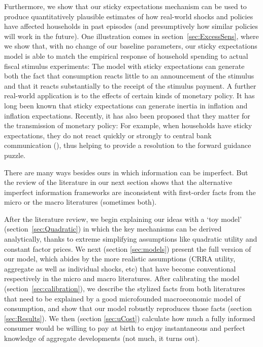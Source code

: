 \documentclass[titlepage]{./econtex}
\begin{document}
Furthermore, we show that our sticky expectations mechanism can be used to produce quantitatively plausible estimates of how real-world shocks and policies have affected households in past episodes (and presumptively how similar policies will work in the future).  One illustration comes in section~\ref{sec:ExcessSens}, where we show that, with no change of our baseline parameters, our sticky expectations model is able to match the empirical response of household spending to actual fiscal stimulus experiments: The model with sticky expectations can generate both the fact that consumption reacts little to an announcement of the stimulus and that it reacts substantially to the receipt of the stimulus payment.  A further real-world application is to the effects of certain kinds of monetary policy. It has long been known that sticky expectations can generate inertia in inflation and inflation expectations. Recently, it has also been proposed that they matter for the transmission of monetary policy: For example, when households have sticky expectations, they do not react quickly or strongly to central bank communication (\cite{arsInvestmentInattention}), thus helping to provide a resolution to the forward guidance puzzle.

There are many ways besides ours in which information can be imperfect.  But the review of the literature in our next section shows that the alternative imperfect information frameworks are inconsistent with first-order facts from the micro or the macro literatures (sometimes both).

After the literature review, we begin explaining our ideas with a `toy model' (section~\ref{sec:Quadratic}) in which the key mechanisms can be derived analytically, thanks to extreme simplifying assumptions like quadratic utility and constant factor prices.  We next (section \ref{sec:models}) present the full version of our model, which abides by the more realistic assumptions (CRRA utility, aggregate as well as individual shocks, etc) that have become conventional respectively in the micro and macro literatures. After calibrating the model (section~\ref{sec:calibration}), we describe the stylized facts from both literatures that need to be explained by a good microfounded macroeconomic model of consumption, and show that our model robustly reproduces those facts (section \ref{sec:Results}).
We then (section \ref{sec:uCost}) calculate how much a fully informed consumer would be willing to pay at birth to enjoy instantaneous and perfect knowledge of aggregate developments (not much, it turns out).
\end{document}
